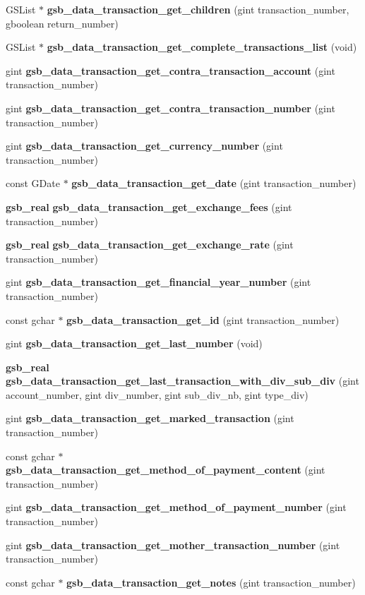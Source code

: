 \begin{DoxyCompactItemize}
\item 
GSList $\ast$ {\bf gsb\_\-data\_\-transaction\_\-get\_\-children} (gint transaction\_\-number, gboolean return\_\-number)
\item 
GSList $\ast$ {\bf gsb\_\-data\_\-transaction\_\-get\_\-complete\_\-transactions\_\-list} (void)
\item 
gint {\bf gsb\_\-data\_\-transaction\_\-get\_\-contra\_\-transaction\_\-account} (gint transaction\_\-number)
\item 
gint {\bf gsb\_\-data\_\-transaction\_\-get\_\-contra\_\-transaction\_\-number} (gint transaction\_\-number)
\item 
gint {\bf gsb\_\-data\_\-transaction\_\-get\_\-currency\_\-number} (gint transaction\_\-number)
\item 
const GDate $\ast$ {\bf gsb\_\-data\_\-transaction\_\-get\_\-date} (gint transaction\_\-number)
\item 
{\bf gsb\_\-real} {\bf gsb\_\-data\_\-transaction\_\-get\_\-exchange\_\-fees} (gint transaction\_\-number)
\item 
{\bf gsb\_\-real} {\bf gsb\_\-data\_\-transaction\_\-get\_\-exchange\_\-rate} (gint transaction\_\-number)
\item 
gint {\bf gsb\_\-data\_\-transaction\_\-get\_\-financial\_\-year\_\-number} (gint transaction\_\-number)
\item 
const gchar $\ast$ {\bf gsb\_\-data\_\-transaction\_\-get\_\-id} (gint transaction\_\-number)
\item 
gint {\bf gsb\_\-data\_\-transaction\_\-get\_\-last\_\-number} (void)
\item 
{\bf gsb\_\-real} {\bf gsb\_\-data\_\-transaction\_\-get\_\-last\_\-transaction\_\-with\_\-div\_\-sub\_\-div} (gint account\_\-number, gint div\_\-number, gint sub\_\-div\_\-nb, gint type\_\-div)
\item 
gint {\bf gsb\_\-data\_\-transaction\_\-get\_\-marked\_\-transaction} (gint transaction\_\-number)
\item 
const gchar $\ast$ {\bf gsb\_\-data\_\-transaction\_\-get\_\-method\_\-of\_\-payment\_\-content} (gint transaction\_\-number)
\item 
gint {\bf gsb\_\-data\_\-transaction\_\-get\_\-method\_\-of\_\-payment\_\-number} (gint transaction\_\-number)
\item 
gint {\bf gsb\_\-data\_\-transaction\_\-get\_\-mother\_\-transaction\_\-number} (gint transaction\_\-number)
\item 
const gchar $\ast$ {\bf gsb\_\-data\_\-transaction\_\-get\_\-notes} (gint transaction\_\-number)

\end{DoxyCompactItemize}
